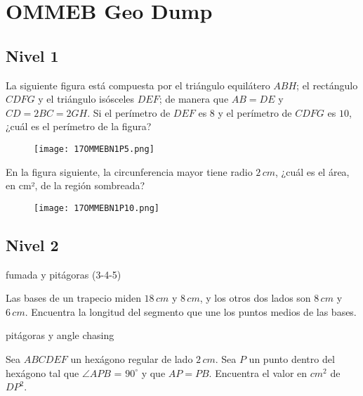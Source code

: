\chapter{OMMEB Geo Dump}

\section{Nivel 1}

\begin{problem}[OMMEB 2017]
    La siguiente figura está compuesta por el triángulo 
    equilátero \(ABH\); el rectángulo \(CDFG\) y el triángulo 
    isósceles \(DEF\); de manera que \(AB = DE\) y 
    \(CD = 2BC = 2GH\). Si el perímetro de \(DEF\) es \(8\) y 
    el perímetro de \(CDFG\) es \(10\), 
    ¿cuál es el perímetro de la figura?
\end{problem}

\begin{figure}[h]
    \centering
    \texttt{[image: 17OMMEBN1P5.png]}
\end{figure}

\begin{problem}[OMMEB 2017]
    En la figura siguiente, la circunferencia mayor tiene radio 
    \(2\, cm\), ¿cuál es el área, en cm², de la región sombreada?
\end{problem}

\begin{figure}[h]
    \centering
    \texttt{[image: 17OMMEBN1P10.png]}
\end{figure}

\section{Nivel 2}

fumada y pitágoras (3-4-5)

\begin{sproblem}[OMMEB 2017]
    Las bases de un trapecio miden \(18\, cm\) y \(8\, cm\), y 
    los otros dos lados son \(8\, cm\) y \(6\, cm\). Encuentra 
    la longitud del segmento que une los puntos medios de las 
    bases.
\end{sproblem}

pitágoras y angle chasing

\begin{problem}[OMMEB 2017]
    Sea $ABCDEF$ un hexágono regular de lado \(2\, cm\). 
    Sea $P$ un punto dentro del hexágono tal que 
    $\angle APB$ = \(90^\circ\) y que $AP = PB$. 
    Encuentra el valor en $cm^2$ de $DP^2$.
\end{problem}

